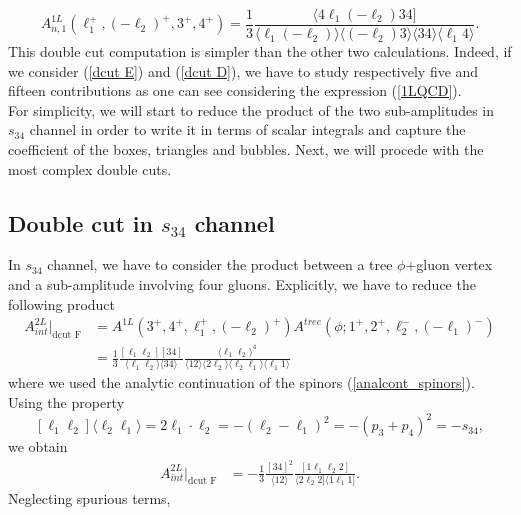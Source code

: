 $$
	A^{1L}_{n,1}(\ell_1^+,(-\ell_2)^+,3^+,4^+)=\frac{1}{3}\frac{\langle 4 \ell_1 (-\ell_2)34]}{\langle \ell_1 (-\ell_2) \rangle \langle (-\ell_2) 3\rangle \langle 34 \rangle \langle \ell_1 4\rangle}.
$$
This double cut computation is simpler than the other two calculations. Indeed, if we consider (\ref{dcut E}) and (\ref{dcut D}), we have to study respectively five and fifteen contributions as one can see considering the expression (\ref{1LQCD}).\\
For simplicity, we will start to reduce the product of the two sub-amplitudes in $s_{34}$ channel in order to write it in terms of scalar integrals and capture the coefficient of the boxes, triangles and bubbles. Next, we will procede with the most complex double cuts.
\subsection{Double cut in $s_{34}$ channel}
In $s_{34}$ channel, we have to consider the product between a tree $\phi$+gluon vertex and a sub-amplitude involving four gluons. Explicitly, we have to reduce the following product
\begin{align*}
	A^{2L}_{int}|_{\text{dcut F}}&=A^{1L}(3^+,4^+,\ell_1^+,(-\ell_2)^+) A^{tree}(\phi;1^+,2^+,\ell_2^-,(-\ell_1)^-)\\
	&=\frac{1}{3}\frac{[\ell_1\ell_2][34]}{\langle \ell_1\ell_2 \rangle\langle 34 \rangle}\frac{\langle \ell_1 \ell_2 \rangle^4}{\langle 1 2 \rangle \langle 2 \ell_2 \rangle \langle \ell_2 \ell_1 \rangle \langle \ell_1 1 \rangle}
\end{align*}
where we used the analytic continuation of the spinors (\ref{analcont_spinors}).\\
Using the property
$$
	[\ell_1\ell_2]\langle \ell_2 \ell_1\rangle=2 \ell_1 \cdot \ell_2=-(\ell_2-\ell_1)^2=-(p_3+p_4)^2=-s_{34},
$$
we obtain
\begin{align}
	A^{2L}_{int}|_{\text{dcut F}}&=-\frac{1}{3}\frac{[34]^2}{\langle 12 \rangle}\frac{[1\ell_1\ell_2 2]}{\langle 2\ell_2 2]\langle 1 \ell_1 1]}.	\label{intstep34}
\end{align}
Neglecting spurious terms,
